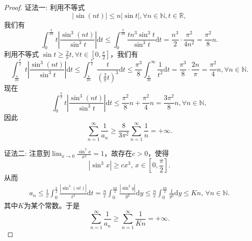 \documentclass[../../main.tex]{subfiles}
\begin{document}
\begin{proof}
{\color{blue}证法一:}
利用不等式
\[
|\sin (nt)| \leqslant n |\sin t|, \forall n \in \mathbb{N}, t \in \mathbb{R},
\]
我们有
\[
\int_{0}^{\frac{\pi}{2n}} t \left| \frac{\sin^3 (nt)}{\sin^3 t} \right| \mathrm{d}t \leqslant \int_{0}^{\frac{\pi}{2n}} \frac{t n^3 \sin^3 t}{\sin^3 t} \mathrm{d}t = \frac{n^3}{2} \cdot \frac{\pi^2}{4n^2} = \frac{\pi^2}{8} n.
\]
利用不等式 \( \sin t \geqslant \frac{2}{\pi} t, \forall t \in \left[ 0, \frac{\pi}{2} \right] \)，我们有
\[
\int_{\frac{\pi}{2n}}^{\frac{\pi}{2}} t \left| \frac{\sin^3 (nt)}{\sin^3 t} \right| \mathrm{d}t \leqslant \int_{\frac{\pi}{2n}}^{\frac{\pi}{2}} \frac{t}{\left( \frac{2}{\pi} t \right)^3} \mathrm{d}t \leqslant \frac{\pi^3}{8} \int_{\frac{\pi}{2n}}^{\infty} \frac{1}{t^2} \mathrm{d}t = \frac{\pi^3}{8} \cdot \frac{2n}{\pi} = \frac{\pi^2}{4} n, \forall n \in \mathbb{N}.
\]
现在
\[
\int_{0}^{\frac{\pi}{2}} t \left| \frac{\sin^3 (nt)}{\sin^3 t} \right| \mathrm{d}t \leqslant \frac{\pi^2}{8} n + \frac{\pi^2}{4} n = \frac{3\pi^2}{8} n, \forall n \in \mathbb{N},
\]
因此
\[
\sum_{n = 1}^{\infty} \frac{1}{a_n} \geqslant \frac{8}{3\pi^2} \sum_{n = 1}^{\infty} \frac{1}{n} = +\infty.
\]

{\color{blue}证法二:}
注意到$\lim_{x\rightarrow 0}\frac{\sin ^3x}{x^3}=1$，故存在$c>0$，使得
\[
|\sin^3 x| \geqslant c x^3, \, x \in \left[ 0, \frac{\pi}{2} \right].
\]
从而
\begin{align*}
a_n \leqslant \frac{1}{c} \int_0^{\frac{\pi}{2}} \frac{|\sin^3 (nt)|}{t^2} \mathrm{d}t = \frac{n}{c} \int_0^{\frac{n\pi}{2}} \frac{|\sin^3 y|}{y^2} \mathrm{d}y \leqslant \frac{n}{c} \int_0^{\frac{n\pi}{2}} \frac{1}{y^2} \mathrm{d}y \leqslant Kn, \, \forall n \in \mathbb{N}.
\end{align*}
其中$K$为某个常数。于是
\[
\sum_{n=1}^{\infty} \frac{1}{a_n} \geqslant \sum_{n=1}^{\infty} \frac{1}{Kn} = +\infty.
\]
\end{proof}
\end{document}
